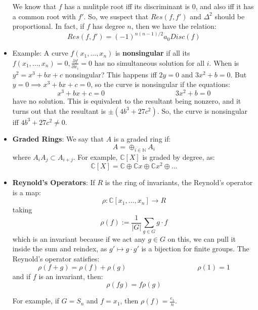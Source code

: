 \documentclass[11pt, oneside]{amsart}   	%
\theoremstyle{definition}
\begin{document}
\begin{itemize}
	We know that $f$ has a mulitple root iff its discriminant is 0, and also iff it has a common root with $f'$. So, we suspect that $Res(f, f')$ and 
	$\Delta^2$ should be proportional. In fact, if $f$ has degree $n$, then we have the relation:
	$$
		Res(f, f') = (-1)^{n(n - 1)/2}a_0Disc(f)
	$$
	
	\item Example: A curve $f(x_1, ..., x_n)$ is \textbf{nonsingular} if all its $f(x_1, ..., x_n) = 0, \frac{\partial f}{\partial x_i} = 0$ has no simultaneous 
	solution for all $i$. When is $y^2 = x^3 + bx + c$ nonsingular? This happens iff $2y = 0$ and $3x^2 + b = 0$. But $y = 0\implies x^3 + bx + c = 0$, 
	so the curve is nonsingular if the equations: 
	$$
		x^3 + bx + c = 0 \;\;\;\;\;\;\;\;\;\;\;\;\;\;\;\;\;\;\;\;\;\;\;\;\;\;\;\;\;\;\;\;\;\;\;\; 3x^2 + b = 0
	$$
	have no solution. This is equivalent to the resultant being nonzero, and it turns out that the resultant is $\pm (4b^3 + 27c^2)$. So, the curve is 
	nonsingular iff $4b^3 + 27c^2\neq 0$. 
	
	\item \textbf{Graded Rings}: We say that $A$ is a graded ring if:
	$$
		A = \oplus_{i\in\mathbb N}A_i
	$$
	where $A_iA_j\subset A_{i + j}$. For example, $\mathbb C[X]$ is graded by degree, as:
	$$
		\mathbb C[X] = \mathbb C\oplus \mathbb Cx\oplus \mathbb Cx^2 \oplus ...
	$$
	
	\item \textbf{Reynold's Operators}: If $R$ is the ring of invariants, the Reynold's operator is a map:
	$$
		\rho : \mathbb C[x_1, ..., x_n]\rightarrow R
	$$
	taking
	$$
		\rho (f) := \frac{1}{|G|}\sum_{g\in G}g\cdot f
	$$
	which is an invariant because if we act any $g\in G$ on this, we can pull it inside the sum and reindex, as $g'\mapsto g\cdot g'$ is a bijection for 
	finite groups. The Reynold's operator satisfies:
	$$
		\rho(f + g) = \rho(f) + \rho(g)\;\;\;\;\;\;\;\;\;\;\;\;\;\;\;\;\;\;\;\;\;\;\;\;\;\;\;\;\;\;\;\;\;\;\;\; \rho(1) = 1
	$$
	and if $f$ is an invariant, then:
	$$
		\rho(fg) = f\rho(g)
	$$
	
	For example, if $G = S_n$ and $f = x_1$, then $\rho(f) = \frac{e_1}{n}$.
	

\end{itemize}
\end{document}
